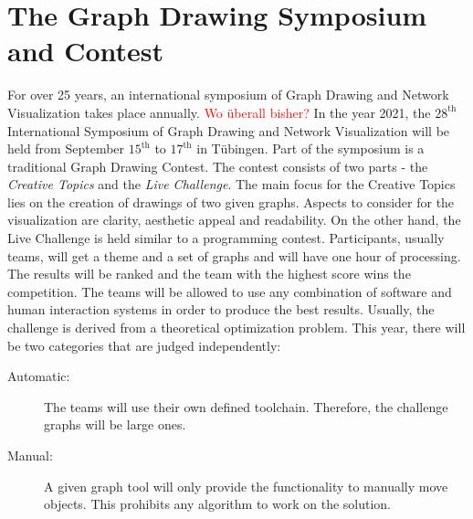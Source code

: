 \section{The Graph Drawing Symposium and Contest}
For over 25 years, an international symposium of Graph Drawing and Network Visualization takes place annually. \textcolor{red}{Wo überall bisher?} In the year 2021, the $28^{\text{th}}$ International Symposium of Graph Drawing and Network Visualization will be held from September $15^{\text{th}}$ to $17^{\text{th}}$ in Tübingen. 
\newline Part of the symposium is a traditional Graph Drawing Contest. The contest consists of two parts - the \textit{Creative Topics} and the \textit{Live Challenge}. The main focus for the Creative Topics lies on the creation of drawings of two given graphs. Aspects to consider for the visualization are clarity, aesthetic appeal and readability.
\newline On the other hand, the Live Challenge is held similar to a programming contest. Participants, usually teams, will get a theme and a set of graphs and will have one hour of processing. The results will be ranked and the team with the highest score wins the competition. The teams will be allowed to use any combination of software and human interaction systems in order to produce the best results. Usually, the challenge is derived from a theoretical optimization problem.
\newline This year, there will be two categories that are judged independently:
\begin{description}
	\item[Automatic:] The teams will use their own defined toolchain. Therefore, the challenge graphs will be large ones.
	\item[Manual:] A given graph tool will only provide the  functionality to manually move objects. This prohibits any algorithm to work on the solution.
\end{description}
